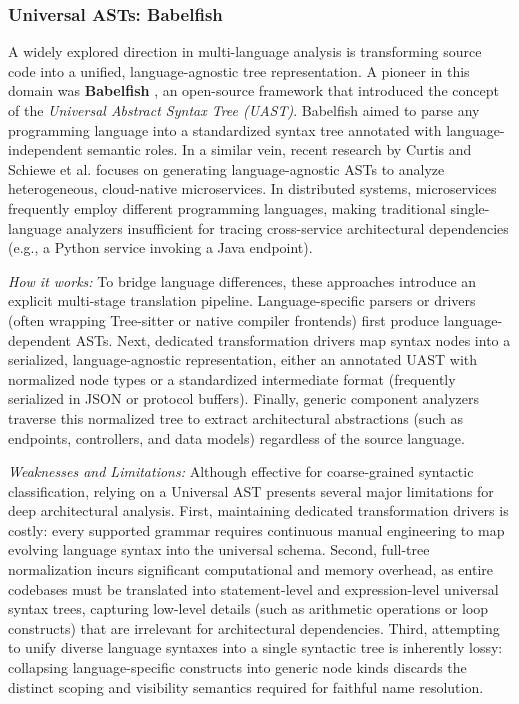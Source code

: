 \subsubsection{Universal ASTs: Babelfish}

A widely explored direction in multi-language analysis is
transforming source code into a unified, language-agnostic tree
representation. A pioneer in this domain was \textbf{Babelfish}
\cite{babelfish_uast}, an open-source framework that introduced the
concept of the \textit{Universal Abstract Syntax Tree (UAST)}.
Babelfish aimed to parse any programming language into a standardized
syntax tree annotated with language-independent semantic roles. In a
similar vein, recent research by Curtis
\cite{curtis_language-agnostic_2022} and Schiewe et al.
\cite{schiewe_advancing_2022} focuses on generating language-agnostic
ASTs to analyze heterogeneous, cloud-native microservices. In
distributed systems, microservices frequently employ different
programming languages, making traditional single-language analyzers
insufficient for tracing cross-service architectural dependencies
(e.g., a Python service invoking a Java endpoint).

\textit{How it works:} To bridge language differences, these approaches
introduce an explicit multi-stage translation pipeline. Language-specific
parsers or drivers (often wrapping Tree-sitter or native compiler frontends)
first produce language-dependent ASTs. Next, dedicated transformation drivers
map syntax nodes into a serialized, language-agnostic representation, either an
annotated UAST with normalized node types or a standardized intermediate format
(frequently serialized in JSON or protocol buffers). Finally, generic component
analyzers traverse this normalized tree to extract architectural abstractions
(such as endpoints, controllers, and data models) regardless of the source
language.

\textit{Weaknesses and Limitations:} Although effective for coarse-grained
syntactic classification, relying on a Universal AST presents several major
limitations for deep architectural analysis. First, maintaining dedicated
transformation drivers is costly: every supported grammar requires continuous
manual engineering to map evolving language syntax into the universal schema.
Second, full-tree normalization incurs significant computational and memory
overhead, as entire codebases must be translated into statement-level and
expression-level universal syntax trees, capturing low-level details (such as
arithmetic operations or loop constructs) that are irrelevant for architectural
dependencies. Third, attempting to unify diverse language syntaxes into a single
syntactic tree is inherently lossy: collapsing language-specific constructs
into generic node kinds discards the distinct scoping and visibility
semantics required for faithful name resolution.

